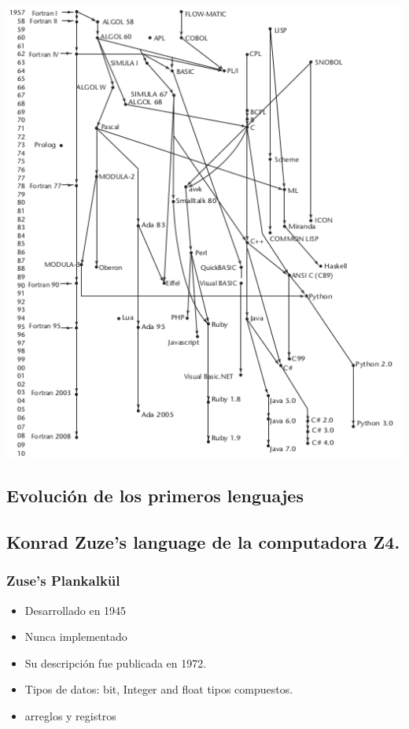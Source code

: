 \documentclass[11pt]{article}
\begin{document}
\includegraphics[width=.9\linewidth]{evolleng.png}

\subsection*{Evolución de los primeros lenguajes}
\label{sec:orgheadline31}

\subsection*{Konrad Zuze's language de la computadora Z4.}
\label{sec:orgheadline33}

\subsubsection*{Zuse's Plankalkül}
\label{sec:orgheadline32}

\begin{itemize}
\item Desarrollado en 1945
\item Nunca implementado
\item Su descripción fue publicada en 1972.
\item Tipos de datos: bit, Integer and float tipos compuestos.
\item arreglos y registros
\end{itemize}
\end{document}
